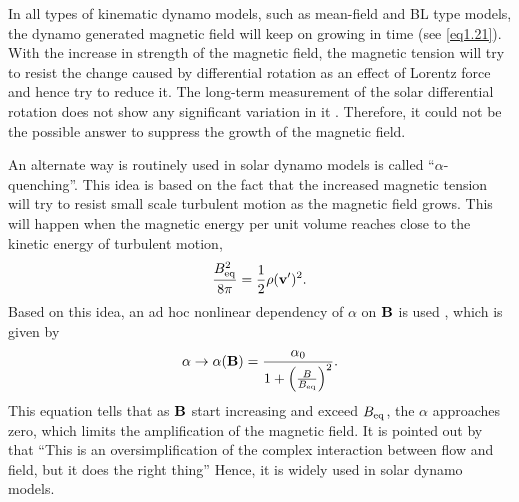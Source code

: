 In all types of kinematic dynamo models, such as mean-field and BL type models, the dynamo generated magnetic field will keep on growing in time (see \autoref{eq1.21}). With the increase in strength of the magnetic field, the magnetic tension will try to resist the change caused by differential rotation as an effect of Lorentz force and hence try to reduce it. The long\hyp term measurement of the solar differential rotation does not show any significant variation in it \citep{Howard1984, Javaraiah2005a, Jha2021}. Therefore, it could not be the possible answer to suppress the growth of the magnetic field. 

An alternate way is routinely used in solar dynamo models is called ``$\alpha$-quenching''. This idea is based on the fact that the increased magnetic tension will try to resist small scale turbulent motion as the magnetic field grows. This will happen when the magnetic energy per unit volume reaches close to the kinetic energy of turbulent motion,
%
\begin{equation}
    \frac{B_{\rm eq}^2}{8\pi}=\frac{1}{2}\rho(\vb{v}^\prime)^2.
    \label{eq1.22}
\end{equation}
%
Based on this idea, an ad hoc nonlinear dependency of $\alpha$ on $\vb{B}$ is used \citep[][and references therein]{Charbonneau2010}, which is given by
%
\begin{equation}
    \alpha \rightarrow \alpha(\vb{B})=\frac{\alpha_0}{1+\left(\frac{B}{B_{\rm eq}}\right)^2}.
\end{equation}
This equation tells that as $\vb{B}$ start increasing and exceed $B_{\rm eq}$, the $\alpha$ approaches zero, which limits the amplification of the magnetic field. It is pointed out by \citep{Charbonneau2010} that  ``This is an oversimplification of the complex interaction between flow and field, but it does the right thing'' Hence, it is widely used in solar dynamo models.


